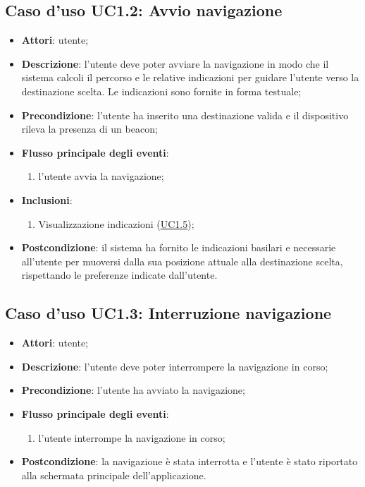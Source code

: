 \documentclass[../AnalisiDeiRequisiti.tex]{subfiles}
\begin{document}
\subsection{Caso d'uso UC1.2: Avvio navigazione}
\begin{itemize}
\item \textbf{Attori}: utente;
\item \textbf{Descrizione}: l'utente deve poter avviare la navigazione in modo che il sistema calcoli il percorso e le relative indicazioni per guidare l'utente verso la destinazione scelta. Le indicazioni sono fornite in forma testuale; 
      \item \textbf{Precondizione}: l'utente ha inserito una destinazione valida e il dispositivo rileva la presenza di un beacon;

        \item \textbf{Flusso principale degli eventi}:
          \begin{enumerate}
          \item l'utente avvia la navigazione;
      \end{enumerate}
    \item \textbf{Inclusioni}:
      \begin{enumerate}
          \item Visualizzazione indicazioni (\hyperlink{UC1.5}{UC1.5});

      \end{enumerate}
    \item \textbf{Postcondizione}: il sistema ha fornito le indicazioni basilari  e necessarie all'utente per muoversi dalla sua posizione attuale alla destinazione scelta, rispettando le preferenze indicate dall'utente.
  \end{itemize}
\hypertarget{UC1.3}{}
\subsection{Caso d'uso UC1.3: Interruzione navigazione}
\begin{itemize}
\item \textbf{Attori}: utente;
\item \textbf{Descrizione}: l'utente deve poter interrompere la navigazione in corso; 
      \item \textbf{Precondizione}: l'utente ha avviato la navigazione;

        \item \textbf{Flusso principale degli eventi}:
          \begin{enumerate}
          \item l'utente interrompe la navigazione in corso;

      \end{enumerate}
    \item \textbf{Postcondizione}: la navigazione è stata interrotta e l'utente è stato riportato alla schermata principale dell'applicazione.
  \end{itemize}
\hypertarget{UC1.4}{}
\end{document}
